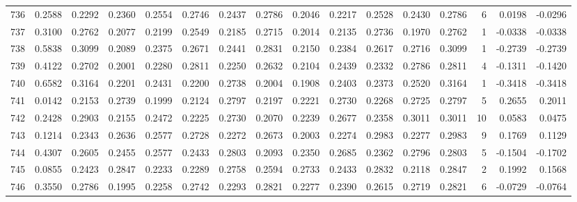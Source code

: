 \begin{tabular}{lrrrrrrrrrrrrrrr}
736 &      0.2588 &  0.2292 &  0.2360 &  0.2554 &  0.2746 &  0.2437 &  0.2786 &  0.2046 &  0.2217 &  0.2528 &   0.2430 &     0.2786 &      6 &                    0.0198 &                    -0.0296 \\
737 &      0.3100 &  0.2762 &  0.2077 &  0.2199 &  0.2549 &  0.2185 &  0.2715 &  0.2014 &  0.2135 &  0.2736 &   0.1970 &     0.2762 &      1 &                   -0.0338 &                    -0.0338 \\
738 &      0.5838 &  0.3099 &  0.2089 &  0.2375 &  0.2671 &  0.2441 &  0.2831 &  0.2150 &  0.2384 &  0.2617 &   0.2716 &     0.3099 &      1 &                   -0.2739 &                    -0.2739 \\
739 &      0.4122 &  0.2702 &  0.2001 &  0.2280 &  0.2811 &  0.2250 &  0.2632 &  0.2104 &  0.2439 &  0.2332 &   0.2786 &     0.2811 &      4 &                   -0.1311 &                    -0.1420 \\
740 &      0.6582 &  0.3164 &  0.2201 &  0.2431 &  0.2200 &  0.2738 &  0.2004 &  0.1908 &  0.2403 &  0.2373 &   0.2520 &     0.3164 &      1 &                   -0.3418 &                    -0.3418 \\
741 &      0.0142 &  0.2153 &  0.2739 &  0.1999 &  0.2124 &  0.2797 &  0.2197 &  0.2221 &  0.2730 &  0.2268 &   0.2725 &     0.2797 &      5 &                    0.2655 &                     0.2011 \\
742 &      0.2428 &  0.2903 &  0.2155 &  0.2472 &  0.2225 &  0.2730 &  0.2070 &  0.2239 &  0.2677 &  0.2358 &   0.3011 &     0.3011 &     10 &                    0.0583 &                     0.0475 \\
743 &      0.1214 &  0.2343 &  0.2636 &  0.2577 &  0.2728 &  0.2272 &  0.2673 &  0.2003 &  0.2274 &  0.2983 &   0.2277 &     0.2983 &      9 &                    0.1769 &                     0.1129 \\
744 &      0.4307 &  0.2605 &  0.2455 &  0.2577 &  0.2433 &  0.2803 &  0.2093 &  0.2350 &  0.2685 &  0.2362 &   0.2796 &     0.2803 &      5 &                   -0.1504 &                    -0.1702 \\
745 &      0.0855 &  0.2423 &  0.2847 &  0.2233 &  0.2289 &  0.2758 &  0.2594 &  0.2733 &  0.2433 &  0.2832 &   0.2118 &     0.2847 &      2 &                    0.1992 &                     0.1568 \\
746 &      0.3550 &  0.2786 &  0.1995 &  0.2258 &  0.2742 &  0.2293 &  0.2821 &  0.2277 &  0.2390 &  0.2615 &   0.2719 &     0.2821 &      6 &                   -0.0729 &                    -0.0764 \\

\end{tabular}
